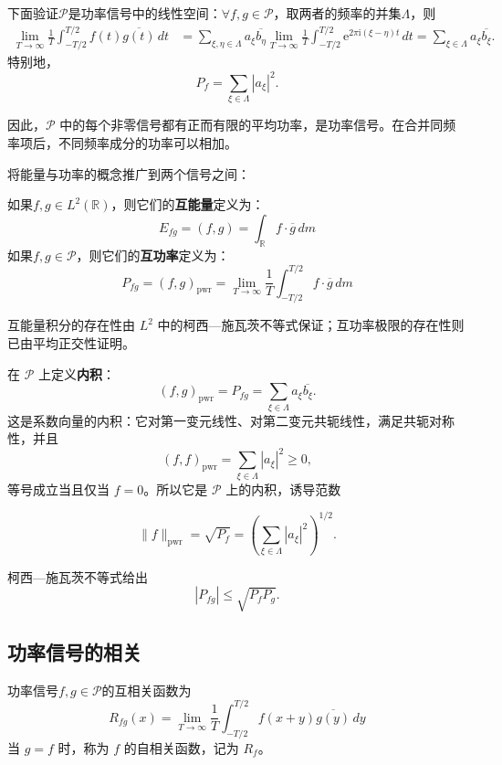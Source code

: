 下面验证$\mathcal{P}$是功率信号中的线性空间：$\forall f,g\in\mathcal{P}$，取两者的频率的并集$\Lambda$，则
\begin{align*}
    \lim_{T\to\infty}\frac1T\int_{-T/2}^{T/2}f(t)\overline{g(t)}\,dt
     & =\sum_{\xi,\eta\in\Lambda}a_\xi\overline{b_\eta}
    \lim_{T\to\infty}\frac1T\int_{-T/2}^{T/2}
    \mathrm e^{2\pi\mathrm i(\xi-\eta)t}\,dt=\sum_{\xi\in\Lambda}a_\xi\overline{b_\xi}.
\end{align*}
特别地，
$$
    P_f=\sum_{\xi\in\Lambda}|a_\xi|^2.
$$

因此，$\mathcal{P}$ 中的每个非零信号都有正而有限的平均功率，是功率信号。在合并同频率项后，不同频率成分的功率可以相加。

将能量与功率的概念推广到两个信号之间：
\begin{definition}[互能量与互功率]\label{def:cross_energy_power}
    如果$f,g\in L^2(\mathbb{R})$，则它们的\textbf{互能量}定义为：
    $$E_{fg}=(f,g)=\int_{\mathbb{R}}f\cdot \overline{g}\,dm$$
    如果$f,g\in \mathcal{P}$，则它们的\textbf{互功率}定义为：
    $$P_{fg}=(f,g)_{\mathrm{pwr}}=\lim_{T\to\infty}\frac{1}{T}\int_{-T/2}^{T/2}f\cdot\overline{g}\,dm$$
\end{definition}

互能量积分的存在性由 $L^2$ 中的柯西—施瓦茨不等式保证；互功率极限的存在性则已由平均正交性证明。

在 $\mathcal{P}$ 上定义\textbf{内积}：
$$
    (f,g)_{\mathrm{pwr}}=P_{fg}
    =\sum_{\xi\in\Lambda}a_\xi\overline{b_\xi}.
$$
这是系数向量的内积：它对第一变元线性、对第二变元共轭线性，满足共轭对称性，并且
$$
    (f,f)_{\mathrm{pwr}}=\sum_{\xi\in\Lambda}|a_\xi|^2\ge0,
$$
等号成立当且仅当 $f=0$。所以它是 $\mathcal{P}$ 上的内积，诱导范数

$$
    \|f\|_{\mathrm{pwr}}=\sqrt{P_f}
    =\left(\sum_{\xi\in\Lambda}|a_\xi|^2\right)^{1/2}.
$$

柯西—施瓦茨不等式给出
$$
    |P_{fg}|\le\sqrt{P_fP_g}.
$$

\subsection{功率信号的相关}\label{sub:power_corelation}

\begin{definition}[功率信号的相关]\label{def:power_correlation}
    功率信号$f,g\in \mathcal{P}$的互相关函数为
    \begin{equation*}
        R_{fg}(x)=\lim_{T\to\infty}\frac{1}{T}\int_{-T/2}^{T/2}f(x+y)\overline{g(y)}\,dy
    \end{equation*}
    当 $g=f$ 时，称为 $f$ 的自相关函数，记为 $R_f$。
\end{definition}

